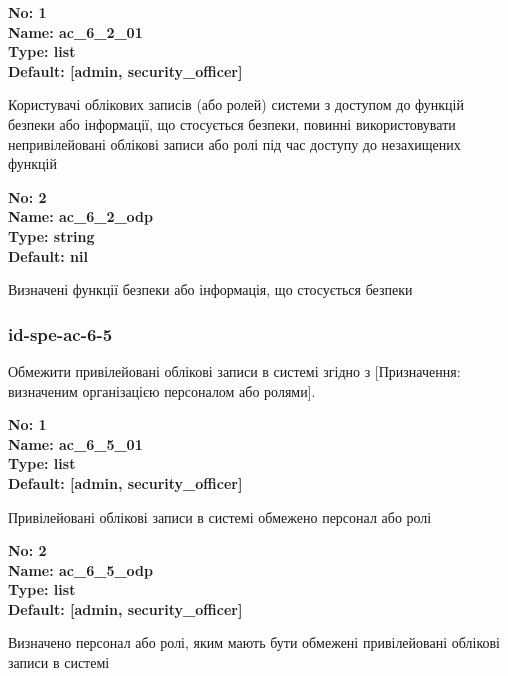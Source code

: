 \documentclass{article}
\begin{document}
\vspace{10pt}
{\footnotesize\bfseries
No: 1\\
Name: ac\_\allowbreak{}6\_\allowbreak{}2\_\allowbreak{}01\\
Type: list\\
Default: [\textquotedbl{}admin\textquotedbl{}, \textquotedbl{}security\_\allowbreak{}officer\textquotedbl{}]
}

{\footnotesize Користувачі облікових записів (або ролей) системи з доступом до функцій безпеки або інформації, що стосується безпеки, повинні використовувати непривілейовані облікові записи або ролі під час доступу до незахищених функцій}


{\footnotesize\bfseries
No: 2\\
Name: ac\_\allowbreak{}6\_\allowbreak{}2\_\allowbreak{}odp\\
Type: string\\
Default: nil
}

{\footnotesize Визначені функції безпеки або інформація, що стосується безпеки}




\subsubsection{id-spe-ac-6-5}
Обмежити привілейовані облікові записи в системі згідно з [Призначення: визначеним організацією персоналом або ролями].

\vspace{10pt}
{\footnotesize\bfseries
No: 1\\
Name: ac\_\allowbreak{}6\_\allowbreak{}5\_\allowbreak{}01\\
Type: list\\
Default: [\textquotedbl{}admin\textquotedbl{}, \textquotedbl{}security\_\allowbreak{}officer\textquotedbl{}]
}

{\footnotesize Привілейовані облікові записи в системі обмежено персонал або ролі}


{\footnotesize\bfseries
No: 2\\
Name: ac\_\allowbreak{}6\_\allowbreak{}5\_\allowbreak{}odp\\
Type: list\\
Default: [\textquotedbl{}admin\textquotedbl{}, \textquotedbl{}security\_\allowbreak{}officer\textquotedbl{}]
}

{\footnotesize Визначено персонал або ролі, яким мають бути обмежені привілейовані облікові записи в системі}
\end{document}
